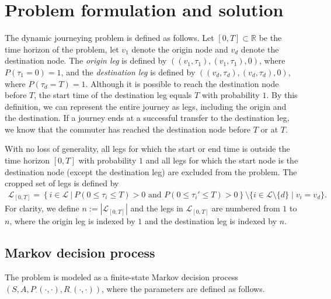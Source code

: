 \documentclass[dissertation,draft*]{aaltoseries}
\begin{document}
\section{Problem formulation and solution}
The dynamic journeying problem is defined as follows.
Let $[0,T] \subset \mathbb{R}$ be the time horizon of the problem,
let $v_1$ denote the origin node and $v_d$ denote the destination node. 
The \emph{origin leg} is defined by $((v_1,\tau_1),(v_1,\tau_1),0)$, where $P(\tau_1=0)=1$, 
and the \emph{destination leg} 
is defined by $((v_{d},\tau_{d}),(v_{d},\tau_{d}),0)$, where $P(\tau_d=T)=1$.
Although it is possible to reach the destination node before $T$, the start time of the 
destination leg equals $T$ with probability $1$. By this definition, we can represent the entire journey 
as legs, including the origin and the destination. If a journey ends at a successful transfer 
to the destination leg, we know that the commuter has reached the destination node before $T$ or at $T$.

With no loss of generality, all legs for
which the start or end time is outside the time horizon $[0,T]$ with probability $1$ and 
all legs for which the start node is the destination node (except the destination leg)
are excluded from the problem.
The cropped set of legs is defined by 
\begin{align*}
\mathcal{L}_{[0,T]}= \left\{i \in \mathcal{L} \ | \ P( 0 \leq \tau_i \leq T) > 0 \mbox{ and } P( 0 \leq \tau_i' \leq T) > 0\right\}
\setminus \{i \in \mathcal{L} \setminus \{d\} \mid v_i = v_d\}.  
\end{align*}
For clarity, we define $n:=|\mathcal{L}_{[0,T]}|$ and the legs in $\mathcal{L}_{[0,T]}$ 
are numbered from $1$ to $n$, where the origin leg is indexed by $1$ and the destination leg is indexed by $n$.

\subsection{Markov decision process}
The problem is modeled as a finite-state Markov decision process $(S,A,P_{\cdot}(\cdot,\cdot),R_{\cdot}(\cdot,\cdot))$, 
where the parameters are defined as follows.
\end{document}
